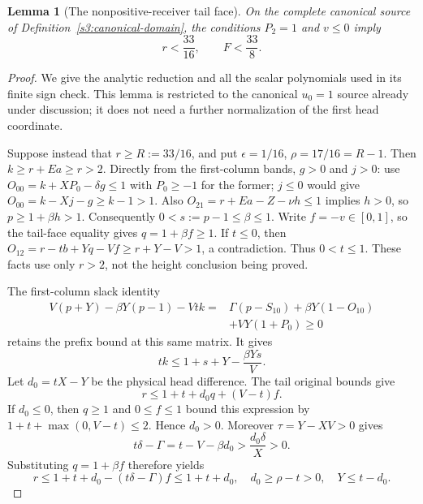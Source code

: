 \documentclass[11pt,reqno]{amsart}
\newtheorem{lemma}[theorem]{Lemma}
\theoremstyle{definition}
\theoremstyle{remark}
\begin{document}
\begin{lemma}[The nonpositive-receiver tail face]
\label{s3:cc-safe-tail}
On the complete canonical source of
Definition~\ref{s3:canonical-domain}, the conditions
\(P_2=1\) and \(v\le0\) imply
\[
 r<\frac{33}{16},\qquad F<\frac{33}{8}.
\]
\end{lemma}
\begin{proof}
We give the analytic reduction and all the scalar polynomials used in
its finite sign check. This lemma is restricted to the canonical
\(u_0=1\) source already under discussion; it does not need a further
normalization of the first head coordinate.

Suppose instead that \(r\ge R:=33/16\), and put
\(\epsilon=1/16\), \(\rho=17/16=R-1\).
Then \(k\ge r+Ea\ge r>2\). Directly from the first-column
bands, \(g>0\) and \(j>0\): use
\(O_{00}=k+XP_0-\delta g\le1\) with \(P_0\ge-1\)
for the former; \(j\le0\) would give
\(O_{00}=k-Xj-g\ge k-1>1\).
Also \(O_{21}=r+Ea-Z-\nu h\le1\) implies \(h>0\),
so \(p\ge1+\beta h>1\). Consequently
\(0<s:=p-1\le\beta\le1\).
Write \(f=-v\in[0,1]\), so the tail-face equality gives
\(q=1+\beta f\ge1\). If \(t\le0\), then
\(O_{12}=r-tb+Yq-Vf\ge r+Y-V>1\), a contradiction.
Thus \(0<t\le1\). These facts use only \(r>2\), not the
height conclusion being proved.

The first-column slack identity
\begin{align*}
 V(p+Y)-\beta Y(p-1)-Vtk
 ={}&\Gamma(p-S_{10})+\beta Y(1-O_{10})\\
 &+VY(1+P_0)\ge0
\end{align*}
retains the prefix bound at this same matrix. It gives
\begin{equation}\label{s3:st-first-payment}
 tk\le1+s+Y-\frac{\beta Ys}{V}.
\end{equation}
Let \(d_0=tX-Y\) be the physical head difference. The tail
original bounds give
\[
 r\le1+t+d_0q+(V-t)f.
\]
If \(d_0\le0\), then \(q\ge1\) and \(0\le f\le1\)
bound this expression by \(1+t+\max(0,V-t)\le2\).
Hence \(d_0>0\). Moreover \(\tau=Y-XV>0\) gives
\[
 t\delta-\Gamma=t-V-\beta d_0>\frac{d_0\delta}{X}>0.
\]
Substituting \(q=1+\beta f\) therefore yields
\[
 r\le1+t+d_0-(t\delta-\Gamma)f\le1+t+d_0,
\quad d_0\ge\rho-t>0,\quad Y\le t-d_0.
\]


\end{proof}
\end{document}

